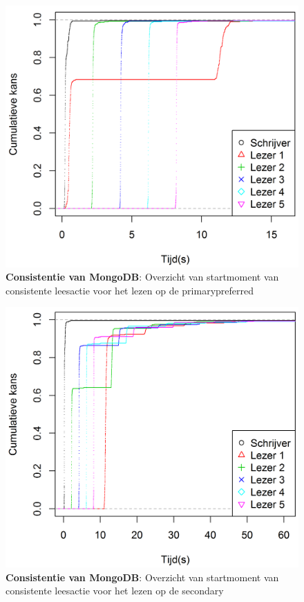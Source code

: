 \begin{figure}[htb!] 
	\centering
	\includegraphics[width=.70\textwidth]{img/Observaties/MongoDB/ECDF-plot-Start-updateRawData-majority-primarypreferred-1}
	\caption{\textbf{Consistentie van MongoDB}: Overzicht van startmoment van consistente leesactie voor het lezen op de primarypreferred }
	\label{fig:consistentie-mongodb-primarypreferred}
\end{figure}
\begin{figure}[htb!] 
	\centering
	\includegraphics[width=.70\textwidth]{img/Observaties/MongoDB/ECDF-plot-Start-updateRawData-majority-secondary-1}
	\caption{\textbf{Consistentie van MongoDB}: Overzicht van startmoment van consistente leesactie voor het lezen op de secondary }
	\label{fig:consistentie-mongodb-secondary}
\end{figure}
